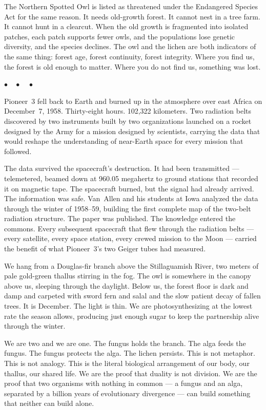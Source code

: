 \documentclass[12pt, letterpaper]{article}
\begin{document}
The Northern Spotted Owl is listed as threatened under the Endangered Species Act for the same reason. It needs old-growth forest. It cannot nest in a tree farm. It cannot hunt in a clearcut. When the old growth is fragmented into isolated patches, each patch supports fewer owls, and the populations lose genetic diversity, and the species declines. The owl and the lichen are both indicators of the same thing: forest age, forest continuity, forest integrity. Where you find us, the forest is old enough to matter. Where you do not find us, something was lost.

\begin{center}
$\bullet\quad\bullet\quad\bullet$
\end{center}

Pioneer~3 fell back to Earth and burned up in the atmosphere over east Africa on December~7, 1958. Thirty-eight hours. 102,322 kilometers. Two radiation belts discovered by two instruments built by two organizations launched on a rocket designed by the Army for a mission designed by scientists, carrying the data that would reshape the understanding of near-Earth space for every mission that followed.

The data survived the spacecraft's destruction. It had been transmitted --- telemetered, beamed down at 960.05 megahertz to ground stations that recorded it on magnetic tape. The spacecraft burned, but the signal had already arrived. The information was safe. Van~Allen and his students at Iowa analyzed the data through the winter of 1958--59, building the first complete map of the two-belt radiation structure. The paper was published. The knowledge entered the commons. Every subsequent spacecraft that flew through the radiation belts --- every satellite, every space station, every crewed mission to the Moon --- carried the benefit of what Pioneer~3's two Geiger tubes had measured.

We hang from a Douglas-fir branch above the Stillaguamish River, two meters of pale gold-green thallus stirring in the fog. The owl is somewhere in the canopy above us, sleeping through the daylight. Below us, the forest floor is dark and damp and carpeted with sword fern and salal and the slow patient decay of fallen trees. It is December. The light is thin. We are photosynthesizing at the lowest rate the season allows, producing just enough sugar to keep the partnership alive through the winter.

We are two and we are one. The fungus holds the branch. The alga feeds the fungus. The fungus protects the alga. The lichen persists. This is not metaphor. This is not analogy. This is the literal biological arrangement of our body, our thallus, our shared life. We are the proof that duality is not division. We are the proof that two organisms with nothing in common --- a fungus and an alga, separated by a billion years of evolutionary divergence --- can build something that neither can build alone.
\end{document}
